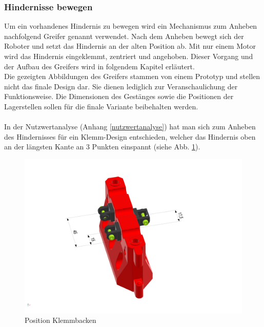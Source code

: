 \newpage

\subsubsection{Hindernisse bewegen}
\label{subsubsection:Hindernisse bewegen}

Um ein vorhandenes Hindernis zu bewegen wird ein Mechanismus zum Anheben nachfolgend Greifer genannt verwendet. Nach dem Anheben bewegt sich der Roboter und setzt das Hindernis an der alten Position ab.
Mit nur einem Motor wird das Hindernis eingeklemmt, zentriert und angehoben. Dieser Vorgang und der Aufbau des Greifers wird in folgendem Kapitel erläutert.\\

 Die gezeigten Abbildungen des Greifers stammen von einem Prototyp und stellen nicht das finale Design dar. Sie dienen lediglich zur Veranschaulichung der Funktionsweise. Die Dimensionen des Gestänges sowie die Positionen der Lagerstellen sollen für die finale Variante beibehalten werden.\\
 \\
In der Nutzwertanalyse (Anhang \ref{nutzwertanalyse}) hat man sich zum Anheben des Hindernisses für ein Klemm-Design entschieden, welcher das Hindernis oben an der längsten Kante an 3 Punkten einspannt (siehe Abb. \ref{fig:obstacle_clamping_concept}). 


\begin{figure}[H]
\centering
\includegraphics[width=0.95\linewidth]{assets/greifer-prototyp/Greifer_Backen_Trimetric.png} 
\caption{Position Klemmbacken}
\label{fig:obstacle_clamping_concept}
\end{figure}


